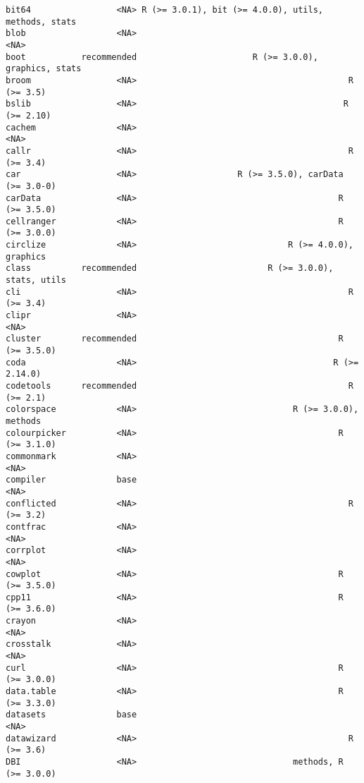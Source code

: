 \documentclass[
  letterpaper,
  DIV=11,
  numbers=noendperiod]{scrreprt}
\begin{document}
\begin{verbatim}
bit64                 <NA> R (>= 3.0.1), bit (>= 4.0.0), utils, methods, stats
blob                  <NA>                                                <NA>
boot           recommended                       R (>= 3.0.0), graphics, stats
broom                 <NA>                                          R (>= 3.5)
bslib                 <NA>                                         R (>= 2.10)
cachem                <NA>                                                <NA>
callr                 <NA>                                          R (>= 3.4)
car                   <NA>                    R (>= 3.5.0), carData (>= 3.0-0)
carData               <NA>                                        R (>= 3.5.0)
cellranger            <NA>                                        R (>= 3.0.0)
circlize              <NA>                              R (>= 4.0.0), graphics
class          recommended                          R (>= 3.0.0), stats, utils
cli                   <NA>                                          R (>= 3.4)
clipr                 <NA>                                                <NA>
cluster        recommended                                        R (>= 3.5.0)
coda                  <NA>                                       R (>= 2.14.0)
codetools      recommended                                          R (>= 2.1)
colorspace            <NA>                               R (>= 3.0.0), methods
colourpicker          <NA>                                        R (>= 3.1.0)
commonmark            <NA>                                                <NA>
compiler              base                                                <NA>
conflicted            <NA>                                          R (>= 3.2)
contfrac              <NA>                                                <NA>
corrplot              <NA>                                                <NA>
cowplot               <NA>                                        R (>= 3.5.0)
cpp11                 <NA>                                        R (>= 3.6.0)
crayon                <NA>                                                <NA>
crosstalk             <NA>                                                <NA>
curl                  <NA>                                        R (>= 3.0.0)
data.table            <NA>                                        R (>= 3.3.0)
datasets              base                                                <NA>
datawizard            <NA>                                          R (>= 3.6)
DBI                   <NA>                               methods, R (>= 3.0.0)

\end{verbatim}
\end{document}
